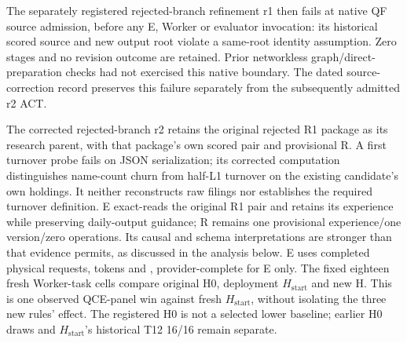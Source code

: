 The separately registered rejected-branch refinement r1 then fails at native
QF source admission, before any E, Worker or evaluator invocation: its
historical scored source and new output root violate a same-root identity
assumption. Zero stages and no revision outcome are retained. Prior
networkless graph/direct-preparation checks had not exercised this native
boundary. The dated source-correction record preserves this failure separately
from the subsequently admitted r2 ACT.

The corrected rejected-branch r2 retains the original rejected R1 package as
its research parent, with that package's own scored pair and provisional R.
 A first turnover
probe fails on JSON serialization; its corrected computation distinguishes
name-count churn from half-L1 turnover on the existing candidate's own
holdings. It neither reconstructs raw filings nor establishes the required
turnover definition. E exact-reads the original R1 pair and retains its
experience while preserving daily-output guidance; R remains one provisional
experience/one version/zero operations. Its causal and schema interpretations
are stronger than that evidence permits, as discussed in the analysis below.
E uses \RejectedBranchRTwoERequests{} completed physical requests,
\RejectedBranchRTwoETokens{} tokens and \RejectedBranchRTwoECost{},
provider-complete for E only. The fixed eighteen fresh Worker-task cells
compare original H0, deployment $H_{\mathrm{start}}$ and new H.
 This is one observed QCE-panel win against fresh
$H_{\mathrm{start}}$, without isolating the three new rules' effect.
The registered H0 is not a selected lower baseline; earlier
H0 draws and $H_{\mathrm{start}}$'s historical T12 16/16 remain separate.
